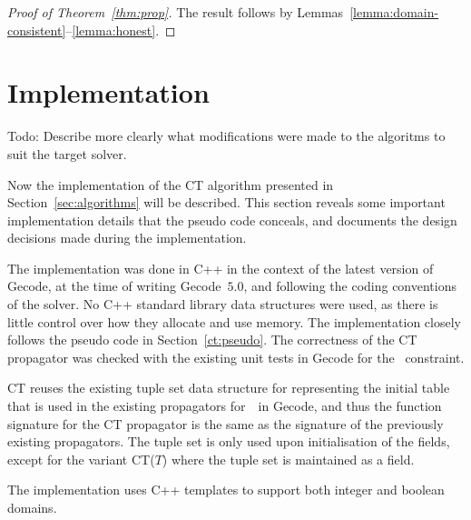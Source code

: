\documentclass[a4paper,11pt]{article}
\newcommand{\Todo}[1]{{\color{blue}#1}}
\newcommand{\Secref}[1]{Section~\ref{#1}}
\newcommand{\Table}{\Constraint{Table}}
\newcommand{\Thmref}[1]{Theorem~\ref{#1}}
\newcommand{\Supports}{\texttt{supports}}
\numberwithin{equation}{section}
\begin{document}
\begin{proof}[Proof of \Thmref{thm:prop}]
  The result follows by Lemmas~\ref{lemma:domain-consistent}--\ref{lemma:honest}.
\end{proof}

\section{Implementation}
\label{sec:implementation}

\Todo{Todo: Describe more clearly what modifications were made to the algoritms
  to suit the target solver.}

Now the implementation of the CT algorithm presented in 
\Secref{sec:algorithms} will be described.
This section reveals some important implementation details
that the pseudo code conceals, and documents the design decisions made during
the implementation.

The implementation was done in C++ in the context of the latest version of Gecode,
at the time of writing Gecode~$5.0$, and following the coding conventions of
the solver.
No C++ standard library data structures
were used, as there is little control over how they allocate and use memory.
The implementation closely follows the pseudo code in \Secref{ct:pseudo}.
The correctness of the CT propagator was checked with the existing unit tests
in Gecode for the \Table~constraint.

CT reuses the existing tuple set data structure for representing the initial table
that is used in the existing propagators for~\Table~in Gecode, and thus the function
signature for the CT propagator is the same as the signature of the previously
existing propagators. The tuple set
is only used upon initialisation of the fields, except for the variant CT($T$) where
the tuple set is maintained as a field.

The implementation uses C++ templates to support both integer and boolean domains.


\end{document}
